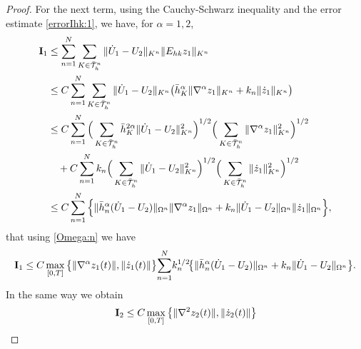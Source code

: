 \documentclass{amsart}
\numberwithin{equation}{section}
\theoremstyle{definition}
\begin{document}
\begin{proof}
For the next term, using the Cauchy-Schwarz inequality and
the error estimate \eqref{errorIhk:1}, we have, for  $\alpha=1,2$,
\begin{equation*}   
  \begin{split}
    {\rm{\bf I}}_1
    &\le \sum_{n=1}^N\sum_{K\in\bar{\mathcal T}_h^n}
    \|\dot U_1-U_2\|_{K^n}\|E_{hk}z_1\|_{K^n}\\
    &\le C \sum_{n=1}^N\sum_{K\in\bar{\mathcal T}_h^n}
    \|\dot U_1-U_2\|_{K^n}
    \big(\bar h_K^\alpha\| \nabla^\alpha z_1\|_{K^n}
    +k_n\| \dot z_1\|_{K^n}\big)\\
    &\le C \sum_{n=1}^N
    \Big(\sum_{K\in\bar{\mathcal T}_h^n}\bar h_K^{2\alpha}
     \|\dot U_1-U_2\|_{K^n}^2\Big)^{1/2}
    \Big(\sum_{K\in\bar{\mathcal T}_h^n}\|\nabla^\alpha z_1\|_{K^n}^2\Big)^{1/2}\\
    &\quad +C \sum_{n=1}^N k_n
    \Big(\sum_{K\in\bar{\mathcal T}_h^n}
     \|\dot U_1-U_2\|_{K^n}^2\Big)^{1/2}
    \Big(\sum_{K\in\bar{\mathcal T}_h^n}
     \| \dot z_1\|_{K^n}^2\Big)^{1/2}\\
    &\leq C \sum_{n=1}^N\Big\{
     \|\bar h_n^\alpha(\dot U_1-U_2)\|_{\Omega^n} 
        \|\nabla^\alpha z_1\|_{\Omega^n}
     +k_n\|\dot U_1-U_2\|_{\Omega^n}
     \|\dot z_1\|_{\Omega^n}\Big\},
  \end{split}
\end{equation*}
that using \eqref{Omega:n} we have
\begin{equation}   \label{aposteriori2:est2}
  \begin{split}
    {\rm{\bf I}}_1
    \le C\max_{[0,T]}\big\{ \|\nabla^\alpha z_1(t)\|, \|\dot z_1(t)\| \big\}\! 
   
    \sum_{n=1}^N \! k_n^{1/2}\!
     \big\{
     \|\bar h_n^\alpha(\dot U_1-U_2)\|_{\Omega^n}
     +k_n\|\dot U_1-U_2\|_{\Omega^n}
     \big\}.
  \end{split}
\end{equation}
In the same way we obtain
\begin{equation}   \label{aposteriori2:est3}
  \begin{split}
    {\rm{\bf I}}_2
    \le C\max_{[0,T]}\big\{\|\nabla^{2}z_2(t)\|,\|\dot z_2(t)\| \big\}\!
    

\end{split}
\end{equation}
\end{proof}
\end{document}
